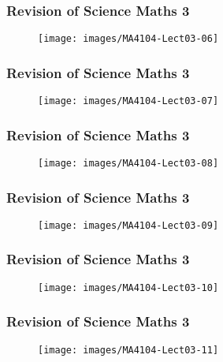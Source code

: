 \documentclass{beamer}
\begin{document}
	\begin{frame}
		\frametitle{Revision of Science Maths 3}
		\begin{figure}
			\centering
			\texttt{[image: images/MA4104-Lect03-06]}
			
		\end{figure}
	\end{frame}
	\begin{frame}
		\frametitle{Revision of Science Maths 3}
		\begin{figure}
			\centering	
			\texttt{[image: images/MA4104-Lect03-07]}
			
		\end{figure}
	\end{frame}
	\begin{frame}
		\frametitle{Revision of Science Maths 3}
		\begin{figure}
			\centering
			\texttt{[image: images/MA4104-Lect03-08]}
			
		\end{figure}
	\end{frame}
	\begin{frame}
		\frametitle{Revision of Science Maths 3}
		\begin{figure}
			\centering	
			\texttt{[image: images/MA4104-Lect03-09]}
			
		\end{figure}
	\end{frame}
	\begin{frame}
		\frametitle{Revision of Science Maths 3}
		\begin{figure}
			\centering
			\texttt{[image: images/MA4104-Lect03-10]}
			
		\end{figure}
	\end{frame}
	\begin{frame}
		\frametitle{Revision of Science Maths 3}
		\begin{figure}
			\centering
			\texttt{[image: images/MA4104-Lect03-11]}
			
		\end{figure}
	\end{frame}
\end{document}
